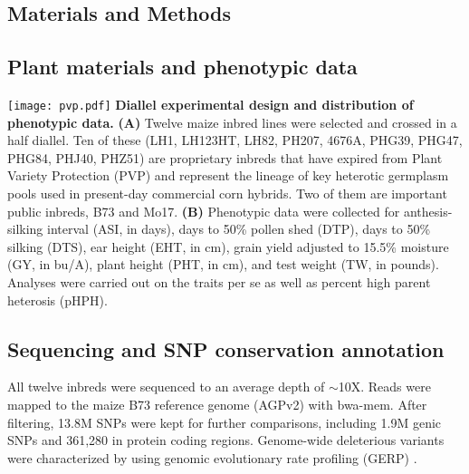 \documentclass[a0,portrait]{a0poster}
\newcommand{\jri}[1]{\textcolor{blue}{ \emph{\scriptsize  #1}} }
\begin{document}
\begin{multicols}{2}

\section*{Materials and Methods}

\subsection*{Plant materials and phenotypic data}
\begin{center}\vspace{1cm}
\texttt{[image: pvp.pdf]}
{\color{black} \textbf{Diallel experimental design and distribution of phenotypic data.}
\textbf{(A)} Twelve maize inbred lines were selected and crossed in a half diallel. Ten of these (LH1, LH123HT, LH82, PH207, 4676A, PHG39, PHG47, PHG84, PHJ40, PHZ51) are proprietary inbreds that have expired from Plant Variety Protection (PVP) and represent the lineage of key heterotic germplasm pools used in present-day commercial corn hybrids. Two of them are important public inbreds, B73 and Mo17. \textbf{(B)} Phenotypic data were collected for anthesis-silking interval (ASI, in days), days to 50\% pollen shed (DTP), days to 50\% silking (DTS), ear height (EHT, in cm), grain yield adjusted to 15.5\% moisture (GY, in bu/A), plant height (PHT, in cm), and test weight (TW, in pounds). Analyses were carried out on the traits per se as well as percent high parent heterosis (pHPH).
}
\end{center}\vspace{1cm}

\subsection*{Sequencing and SNP conservation annotation}
All twelve inbreds were sequenced to an average depth of $\sim$10X. Reads were mapped to the maize B73 reference genome (AGPv2) with bwa-mem.  After filtering, 13.8M SNPs were kept for further comparisons, including 1.9M genic SNPs and 361,280 in protein coding regions. Genome-wide deleterious variants were characterized by using genomic evolutionary rate profiling (GERP) \citep{Davydov2010}. %


\end{multicols}
\end{document}
